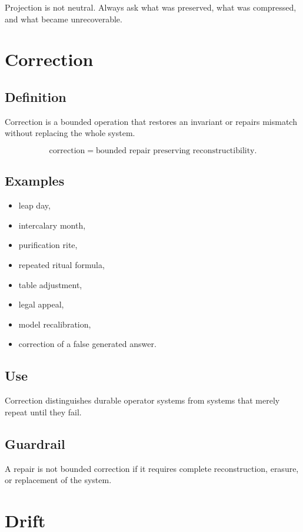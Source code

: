 \documentclass[11pt]{book}
\begin{document}
Projection is not neutral. Always ask what was preserved, what was compressed, and what became unrecoverable.

\section{Correction}

\subsection*{Definition}

Correction is a bounded operation that restores an invariant or repairs mismatch without replacing the whole system.

\[
\text{correction} = \text{bounded repair preserving reconstructibility}.
\]

\subsection*{Examples}

\begin{itemize}
    \item leap day,
    \item intercalary month,
    \item purification rite,
    \item repeated ritual formula,
    \item table adjustment,
    \item legal appeal,
    \item model recalibration,
    \item correction of a false generated answer.
\end{itemize}

\subsection*{Use}

Correction distinguishes durable operator systems from systems that merely repeat until they fail.

\subsection*{Guardrail}

A repair is not bounded correction if it requires complete reconstruction, erasure, or replacement of the system.

\section{Drift}
\end{document}
